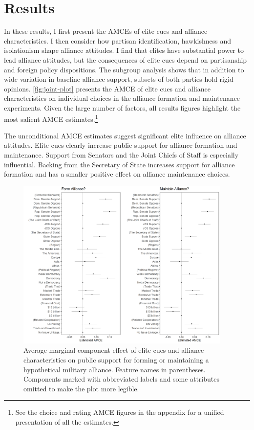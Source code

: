 \documentclass[12pt]{article}
\begin{document}
\section{Results} 


In these results, I first present the AMCEs of elite cues and alliance characteristics.
I then consider how partisan identification, hawkishness and isolationism shape alliance attitudes. 
I find that elites have substantial power to lead alliance attitudes, but the consequences of elite cues depend on partisanship and foreign policy dispositions.
The subgroup analysis shows that in addition to wide variation in baseline alliance support, subsets of both parties hold rigid opinions. 
\autoref{fig:joint-plot} presents the AMCE of elite cues and alliance characteristics on individual choices in the alliance formation and maintenance experiments.
Given the large number of factors, all results figures highlight the most salient AMCE estimates.\footnote{See the choice and rating AMCE figures in the appendix for a unified presentation of all the estimates.}


The unconditional AMCE estimates suggest significant elite influence on alliance attitudes. 
Elite cues clearly increase public support for alliance formation and maintenance. 
Support from Senators and the Joint Chiefs of Staff is especially influential.
Backing from the Secretary of State increases support for alliance formation and has a smaller positive effect on alliance maintenance choices. 


\begin{figure}
	\centering
		\includegraphics[width=0.95\textwidth]{../figures/joint-amce-plots.png}
	\caption{Average marginal component effect of elite cues and alliance characteristics on public support for forming or maintaining a hypothetical military alliance. Feature names in parentheses. Components marked with abbreviated labels and some attributes omitted to make the plot more legible.}
	\label{fig:joint-plot}
\end{figure}
\end{document}
